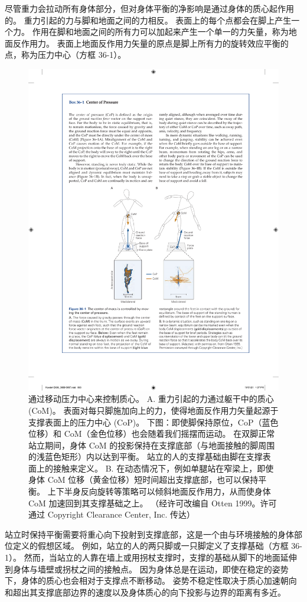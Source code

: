尽管重力会拉动所有身体部分，但对身体平衡的净影响是通过身体的质心起作用的。 重力引起的力与脚和地面之间的力相反。 表面上的每个点都会在脚上产生一个力。 作用在脚和地面之间的所有力可以加起来产生一个单一的力矢量，称为地面反作用力。 表面上地面反作用力矢量的原点是脚上所有力的旋转效应平衡的点，称为压力中心（方框 36-1）。

\begin{figure}[htbp]
	\centering
	\includegraphics[width=0.6\linewidth]{chap36/fig_36_1}
	\caption{通过移动压力中心来控制质心。 A. 重力引起的力通过躯干中的质心 (CoM)。 表面对每只脚施加向上的力，使得地面反作用力矢量起源于支撑表面上的压力中心 (CoP)。 下图：即使脚保持原位，CoP（蓝色位移）和 CoM（金色位移）也会随着我们摇摆而运动。 在双脚正常站立期间，身体 CoM 的投影保持在支撑底部（与地面接触的脚周围的浅蓝色矩形）内以达到平衡。 站立的人的支撑基础由脚在支撑表面上的接触来定义。 B. 在动态情况下，例如单腿站在窄梁上，即使身体 CoM 位移（黄金位移）短时间超出支撑底部，也可以保持平衡。 上下半身反向旋转等策略可以倾斜地面反作用力，从而使身体 CoM 加速回到其支撑基础之上。 （经许可改编自 Otten 1999。许可通过 Copyright Clearance Center, Inc. 传达）}
	\label{fig:36_1}
\end{figure}


站立时保持平衡需要将重心向下投射到支撑底部，这是一个由与环境接触的身体部位定义的假想区域。 例如，站立的人的两只脚或一只脚定义了支撑基础（方框 36-1）。 然而，当站立的人靠在墙上或用拐杖支撑时，支撑的基础从脚下的地面延伸到身体与墙壁或拐杖之间的接触点。 因为身体总是在运动，即使在稳定的姿势下，身体的质心也会相对于支撑点不断移动。 姿势不稳定性取决于质心加速朝向和超出其支撑底部边界的速度以及身体质心的向下投影与边界的距离有多近。

